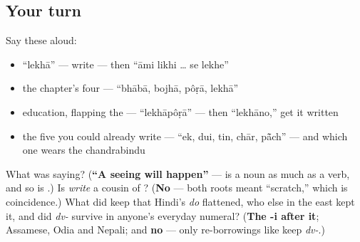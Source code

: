 \subsection*{Your turn}
Say these aloud:

\begin{itemize}
\raggedright
  \item \textquotedblleft{}lekhā\textquotedblright{} — write — then \textquotedblleft{}āmi likhi … se lekhe\textquotedblright{}
  \item the chapter's four — \textquotedblleft{}bhābā, bojhā, pôṛā, lekhā\textquotedblright{}
  \item education, flapping the  — \textquotedblleft{}lekhāpôṛā\textquotedblright{} — then \textquotedblleft{}lekhāno,\textquotedblright{} get it written
  \item the five you could already write — \textquotedblleft{}ek, dui, tin, chār, pā̃ch\textquotedblright{} — and which one wears the chandrabindu
\end{itemize}

\begin{tcolorbox}[breakable,colback=teal!4,colframe=teal!35!black,title={Before you move on}]
What was \textbf{ } saying? (\textbf{\textquotedblleft{}A seeing will happen\textquotedblright{}} —  is a noun as much as a verb, and so is .) Is \emph{write} a cousin of ? (\textbf{No} — both roots meant \textquotedblleft{}scratch,\textquotedblright{} which is coincidence.) What did \textbf{} keep that Hindi's \emph{do} flattened, who else in the east kept it, and did \emph{dv-} survive in anyone's everyday numeral? (\textbf{The -i after it}; Assamese, Odia and Nepali; and \textbf{no} — only re-borrowings like \textbf{} keep \emph{dv-}.)
\end{tcolorbox}
